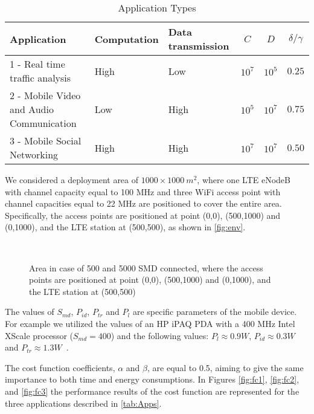\documentclass[twoside,openright]{report}
\begin{document}
\begin{table}[tbp]

\begin{center}
\caption{Application Types}
\label{tab:Apps}
{
\renewcommand{\arraystretch}{2}
\begin{tabular}{p{2in}|p{1in}|p{1in}|c|c|c}\hline\hline 
Application & Computation & Data transmission & $C$ & $D$ & $\delta/\gamma$\\  \hline
1 - Real time traffic analysis &  High & Low &  $10^7$ & $10^5$ & $0.25$\\
2 - Mobile Video and Audio Communication &  Low & High &  $10^5$ & $10^7$ & $0.75$\\ 
3 - Mobile Social Networking &  High & High &  $10^7$ & $10^7$ & $0.50$\\ \hline
\end{tabular}
}
\end{center}
\end{table}

We considered a deployment area of $1000\times1000\ m^2$, where one \gls{LTE} eNodeB with channel capacity equal to 100 MHz and three \gls{WiFi} access point with channel capacities equal to 22 MHz are positioned to cover the entire area. 
Specifically, the access points are positioned at point (0,0), (500,1000) and (0,1000), and the LTE station at (500,500), as shown in \autoref{fig:env}. 

\begin{figure}[tbp]%
\centering
{}\\
\caption{Area in case of 500 and 5000 SMD connected, where the access points are positioned at point (0,0), (500,1000) and (0,1000), and the LTE station at (500,500)}
\label{fig:env}
\end{figure}

The values of $S_{\textit{md}}$, $P_{\textit{id}}$, $P_{\textit{tr}}$ and $P_l$ are specific parameters of the mobile device. For example we utilized the values of an HP iPAQ PDA with a 400 MHz Intel XScale processor ($S_{\textit{md}}=400$) and the following values: $P_l\approx0.9 W$, $P_{\textit{id}}\approx0.3 W$ and $P_{\textit{tr}}\approx1.3 W$~\cite{Kumar}.

The cost function coefficients, $\alpha$ and $\beta$, are equal to 0.5, aiming to give the same importance to both time and energy consumptions. In Figures \ref{fig:fc1}, \ref{fig:fc2}, and \ref{fig:fc3} the performance results of the cost function are represented for the three applications described in \autoref{tab:Apps}.
\end{document}
